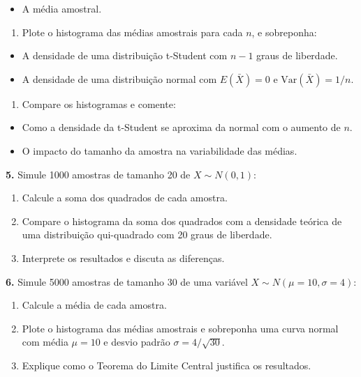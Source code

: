 \documentclass[
]{book}
\providecommand{\tightlist}{%
  \setlength{\itemsep}{0pt}\setlength{\parskip}{0pt}}
\begin{document}
\begin{itemize}
\tightlist
\item
  A média amostral.
\end{itemize}

\begin{enumerate}
\def\labelenumi{(\alph{enumi})}
\setcounter{enumi}{2}
\tightlist
\item
  Plote o histograma das médias amostrais para cada \(n\), e sobreponha:
\end{enumerate}

\begin{itemize}
\item
  A densidade de uma distribuição t-Student com \(n - 1\) graus de liberdade.
\item
  A densidade de uma distribuição normal com \(E(\bar{X}) = 0\) e \(\text{Var}(\bar{X}) = 1/n\).
\end{itemize}

\begin{enumerate}
\def\labelenumi{(\alph{enumi})}
\setcounter{enumi}{3}
\tightlist
\item
  Compare os histogramas e comente:
\end{enumerate}

\begin{itemize}
\item
  Como a densidade da t-Student se aproxima da normal com o aumento de \(n\).
\item
  O impacto do tamanho da amostra na variabilidade das médias.
\end{itemize}

\textbf{5.} Simule 1000 amostras de tamanho 20 de \(X \sim N(0, 1)\):

\begin{enumerate}
\def\labelenumi{(\alph{enumi})}
\item
  Calcule a soma dos quadrados de cada amostra.
\item
  Compare o histograma da soma dos quadrados com a densidade teórica de uma distribuição qui-quadrado com 20 graus de liberdade.
\item
  Interprete os resultados e discuta as diferenças.
\end{enumerate}

\textbf{6.} Simule 5000 amostras de tamanho 30 de uma variável \(X \sim N(\mu=10, \sigma=4)\):

\begin{enumerate}
\def\labelenumi{(\alph{enumi})}
\item
  Calcule a média de cada amostra.
\item
  Plote o histograma das médias amostrais e sobreponha uma curva normal com média \(\mu = 10\) e desvio padrão \(\sigma = 4/\sqrt{30}\).
\item
  Explique como o Teorema do Limite Central justifica os resultados.
\end{enumerate}
\end{document}
